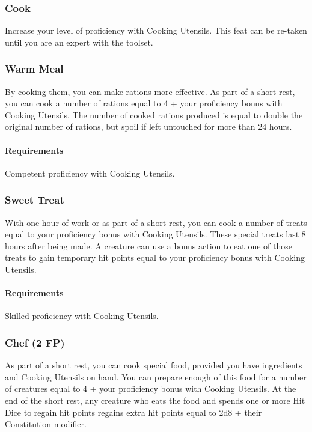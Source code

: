 \subsubsection{Cook} \label{feat::cook}
    Increase your level of proficiency with Cooking Utensils.
    This feat can be re-taken until you are an expert with the toolset.
\subsubsection{Warm Meal} \label{feat::warmmeal}
    By cooking them, you can make rations more effective.
    As part of a short rest, you can cook a number of rations equal to 4 + your proficiency bonus with Cooking Utensils.
    The number of cooked rations produced is equal to double the original number of rations, but spoil if left untouched for more than 24 hours.
    \paragraph{Requirements} Competent proficiency with Cooking Utensils.
\subsubsection{Sweet Treat} \label{feat::sweettreat}
    With one hour of work or as part of a short rest, you can cook a number of treats equal to your proficiency bonus with Cooking Utensils.
    These special treats last 8 hours after being made.
    A creature can use a bonus action to eat one of those treats to gain temporary hit points equal to your proficiency bonus with Cooking Utensils.
    \paragraph{Requirements} Skilled proficiency with Cooking Utensils.
\subsubsection{Chef (2 FP)} \label{feat::chef}
    As part of a short rest, you can cook special food, provided you have ingredients and Cooking Utensils on hand.
    You can prepare enough of this food for a number of creatures equal to 4 + your proficiency bonus with Cooking Utensils.
    At the end of the short rest, any creature who eats the food and spends one or more Hit Dice to regain hit points regains extra hit points equal to 2d8 + their Constitution modifier.
